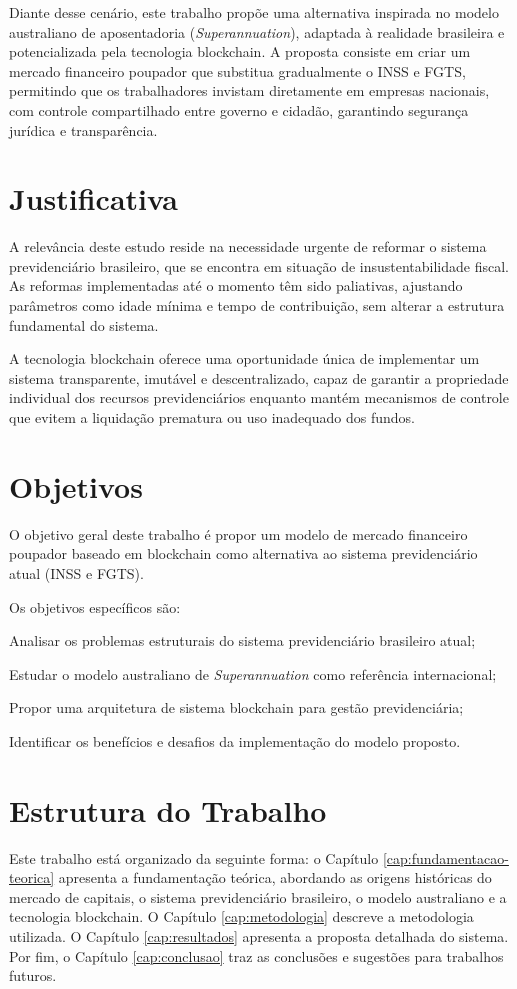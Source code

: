 Diante desse cenário, este trabalho propõe uma alternativa inspirada no modelo australiano de aposentadoria (\textit{Superannuation}), adaptada à realidade brasileira e potencializada pela tecnologia blockchain. A proposta consiste em criar um mercado financeiro poupador que substitua gradualmente o INSS e FGTS, permitindo que os trabalhadores invistam diretamente em empresas nacionais, com controle compartilhado entre governo e cidadão, garantindo segurança jurídica e transparência.

\section*{Justificativa}

A relevância deste estudo reside na necessidade urgente de reformar o sistema previdenciário brasileiro, que se encontra em situação de insustentabilidade fiscal. As reformas implementadas até o momento têm sido paliativas, ajustando parâmetros como idade mínima e tempo de contribuição, sem alterar a estrutura fundamental do sistema.

A tecnologia blockchain oferece uma oportunidade única de implementar um sistema transparente, imutável e descentralizado, capaz de garantir a propriedade individual dos recursos previdenciários enquanto mantém mecanismos de controle que evitem a liquidação prematura ou uso inadequado dos fundos.

\section*{Objetivos}

O objetivo geral deste trabalho é propor um modelo de mercado financeiro poupador baseado em blockchain como alternativa ao sistema previdenciário atual (INSS e FGTS).

Os objetivos específicos são:
\begin{alineas}
    \item Analisar os problemas estruturais do sistema previdenciário brasileiro atual;
    \item Estudar o modelo australiano de \textit{Superannuation} como referência internacional;
    \item Propor uma arquitetura de sistema blockchain para gestão previdenciária;
    \item Identificar os benefícios e desafios da implementação do modelo proposto.
\end{alineas}

\section*{Estrutura do Trabalho}

Este trabalho está organizado da seguinte forma: o Capítulo \ref{cap:fundamentacao-teorica} apresenta a fundamentação teórica, abordando as origens históricas do mercado de capitais, o sistema previdenciário brasileiro, o modelo australiano e a tecnologia blockchain. O Capítulo \ref{cap:metodologia} descreve a metodologia utilizada. O Capítulo \ref{cap:resultados} apresenta a proposta detalhada do sistema. Por fim, o Capítulo \ref{cap:conclusao} traz as conclusões e sugestões para trabalhos futuros.
